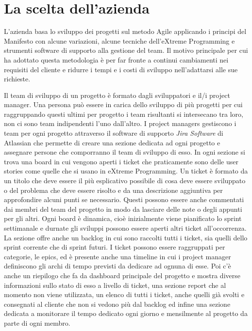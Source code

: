 \documentclass[target=bach,aauheader=,style=]{thud}
\begin{document}
\section{La scelta dell'azienda}
L'azienda basa lo sviluppo dei progetti sul metodo Agile applicando i principi del Manifesto con alcune variazioni, alcune tecniche dell'eXtreme Programming
e strumenti software di supporto alla gestione del team.
Il motivo principale per cui ha adottato questa metodologia è per far fronte a continui cambiamenti nei requisiti del cliente e ridurre i tempi e i costi
di sviluppo nell'adattarsi alle sue richieste.
\par Il team di sviluppo di un progetto è formato dagli sviluppatori e il/i project manager. Una persona può essere in carica dello sviluppo di più progetti per cui
raggruppando questi ultimi per progetto i team risultanti si intersecano tra loro, non ci sono team indipendenti l'uno dall'altro.
I project managers gestiscono i team per ogni progetto attraverso il software di supporto \textit{Jira Software} di Atlassian\cite{atlassian_jira} che permette
di creare una sezione dedicata ad ogni progetto e assegnare persone che comporranno il team di sviluppo di esso.
In ogni sezione si trova una board in cui vengono aperti i ticket che praticamente sono delle user stories come quelle che si usano in eXtreme Programming.
Un ticket è formato da un titolo che deve essere il più esplicativo possibile di cosa deve essere sviluppato o del problema che deve essere risolto e da una
descrizione aggiuntiva per approfondire alcuni punti se necessario. Questi possono essere anche commentati dai membri del team del progetto in modo da lasciare
delle note o degli appunti per gli altri.
Ogni board è dinamica, cioè inizialmente viene pianificato lo sprint settimanale e durnate gli sviluppi possono essere aperti altri ticket all'occorrenza.
La sezione offre anche un backlog in cui sono raccolti tutti i ticket, sia quelli dello sprint corrente che di sprint futuri.
I ticket possono essere raggruppati per categorie, le epics, ed è presente anche una timeline in cui i project manager definiscono gli archi di tempo previsti
da dedicare ad ognuna di esse. Poi c'è anche un riepilogo che fa da dashboard principale del progetto e mostra diverse informazioni sullo stato di esso a livello
di ticket, una sezione report che al momento non viene utilizzata, un elenco di tutti i ticket, anche quelli già svolti e consegnati al cliente che non si vedono
più dal backlog ed infine una sezione dedicata a monitorare il tempo dedicato ogni giorno e mensilmente al progetto da parte di ogni membro.
\end{document}
